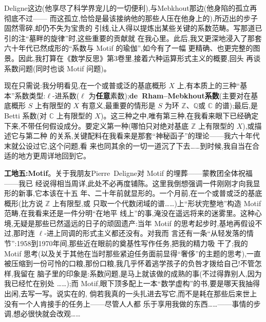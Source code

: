 \pmark{}Deligne这边(他享尽了科学界宠儿的一切便利),与Mebkhout那边(他身陷的孤立再彻底不过——
而这孤立,恰恰是最该接纳他的那些人压在他身上的),所迈出的步子固然零碎,却仍不失为宝贵的
引线,让人得以提炼出某些关键的系数范畴。写那道已引的注“墓畔的旋律”时,这些重要的贡献就
在我心里。此后,我又更深地浸入了那套六十年代已然成形的“系数与 Motif 的瑜伽”,如今有了一幅
更精确、也更完整的图景。因此,我打算在《数学反思》第3卷里,接着六种运算形式主义的概要,回头
再谈系数问题(同时也谈 Motif 问题)。

现在只需说:我分明看见,在一个或普或泛的基底概形 $X$ 上,有本质上的三种“基本”系数类型:$\ell$-进系数($\ell$ 为\textbf{任意}素数);\textbf{de~Rham--Mebkhout系数}(主要对在基底概形 $S$ 上有限型的 $X$ 有意义,最\dmark{}重要的情形是 $S$ 为环 $\mathbb{Z}$、$\mathbb{Q}$或 $\mathbb{C}$ 的谱);最后,是 Betti 系数(对 $\mathbb{C}$ 上有限型的 $X$)。这三种之中,唯有第三种,在我看来眼下已经确定下来,不带任何假设成分。要定义第一种(哪怕只对绝对基底 $\mathbb{Z}$ 上有限型的 $X$),或描述它与第二种
的关系,关键配料在我看来是那套“神秘函子”的理论——我六十年代末就公设过它,这个问题,看
来也同其余的一切一道沉了下去……到时候,我自当在合适的地方更周详地回到它。

\textbf{工地五:Motif}。关于我朋友Pierre~Deligne对 Motif 的埋葬——蒙教团全体祝福——我已
经说得相当周详,此处不必再度铺陈。这里我倒想强调一件刚刚才向我显形的新事,它本该在十五
年、二十年前就显形的。一个月前,在一个或普或泛的基底概形(比方说 $\mathbb{Z}$ 上有限型,或
只取一个代数闭域的谱……)上“形状完整地”构造 Motif 范畴,在我看来还是一件分明“在地平
线上”的事,淹没在遥远将来的迷雾里。这种心境,无疑是那些已然遥远的日子的顽固遗产:当年
Motif 的思考起步时,基地再假设不过,那时连 $\ell$-进上同调的形式主义都还没有。对我而
言还有一条“从轻发落的情节”:1958到1970年间,那些近在眼前的奠基性写作任务,把我的精力吸
干了;我的 Motif 思考(以及关于其他在当时那些紧迫任务面前显得“奢侈”的主题的思考),一直
被压缩到一份可怜的口粮,那份口粮,我几乎怀着逃学孩子的负咎才拨给自己!不管怎样,我留在
脑子里的印象是:系数问题,是马上就该做的成熟的事(不过得靠别人,因为我已经忙在别处
……);而 Motif,眼下顶多配上一本“数学虚构”的书,要是哪天我抽得出闲,去写一写。说实在的,
倘若我真的一头扎进去写它,而不是耗在那些后来世上没有一个人肯接手的任务上——尽管人人都
乐于享用我做的东西……——事情的步调,想必很快就会改观……

